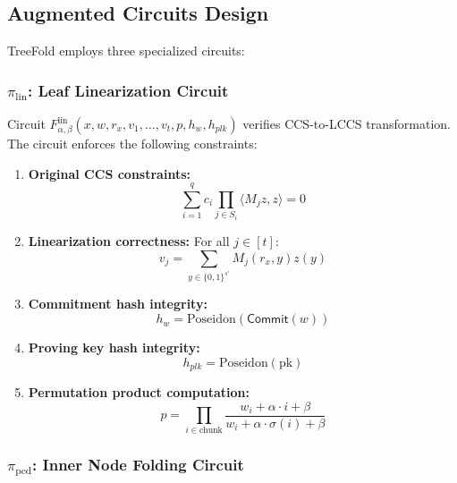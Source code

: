 \documentclass[11pt,a4paper]{article}
\theoremstyle{plain}
\theoremstyle{definition}
\newcommand{\Com}{\mathsf{Commit}}
\begin{document}
\subsection{Augmented Circuits Design}

TreeFold employs three specialized circuits:

\subsubsection{$\pi_{\text{lin}}$: Leaf Linearization Circuit}

Circuit $F^{\text{lin}}_{\alpha,\beta}(x, w, r_x, v_1, \ldots, v_t, p, h_w, h_{plk})$ verifies CCS-to-LCCS transformation. The circuit enforces the following constraints:

\begin{tcolorbox}[title=Leaf Linearization Circuit Constraints]
\begin{enumerate}[itemsep=5pt]
\item \textbf{Original CCS constraints:} 
\begin{equation}
\sum_{i=1}^q c_i \prod_{j \in S_i} \langle M_j z, z \rangle = 0
\end{equation}

\item \textbf{Linearization correctness:} For all $j \in [t]$:
\begin{equation}
v_j = \sum_{y \in \{0,1\}^{s'}} M_j(r_x, y) z(y)
\end{equation}

\item \textbf{Commitment hash integrity:}
\begin{equation}
h_w = \text{Poseidon}(\Com(w))
\end{equation}

\item \textbf{Proving key hash integrity:}
\begin{equation}
h_{plk} = \text{Poseidon}(\text{pk})
\end{equation}

\item \textbf{Permutation product computation:}
\begin{equation}
p = \prod_{i \in \text{chunk}} \frac{w_i + \alpha \cdot i + \beta}{w_i + \alpha \cdot \sigma(i) + \beta}
\end{equation}
\end{enumerate}
\end{tcolorbox}


\subsubsection{$\pi_{\text{pcd}}$: Inner Node Folding Circuit}
\end{document}
